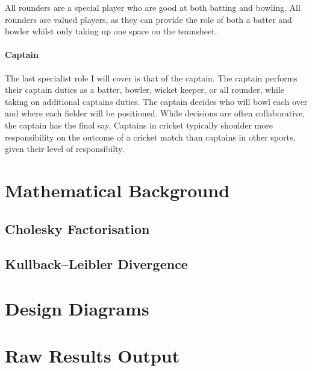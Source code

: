 \documentclass[12pt,a4paper]{report}
\theoremstyle{definition}
\begin{document}
All rounders are a special player who are good at both batting and bowling.
All rounders are valued players, as they can provide the role of both a batter and bowler whilst only taking up one space on the teamsheet.

\subsubsection{Captain}

The last specialist role I will cover is that of the captain. 
The captain performs their captain duties as a batter, bowler, wicket keeper, or all rounder, while taking on additional captains duties.
The captain decides who will bowl each over and where each fielder will be positioned. 
While decisions are often collaborative, the captain has the final say.
Captains in cricket typically shoulder more responsibility on the outcome of a cricket match than captains in other sports, given their level of responsibilty.

\chapter{Mathematical Background}

\section{Cholesky Factorisation} \label{sec:CholFac}

\section{Kullback–Leibler Divergence} \label{sec:KLDiv}

\chapter{Design Diagrams}

\chapter{Raw Results Output}
\end{document}
